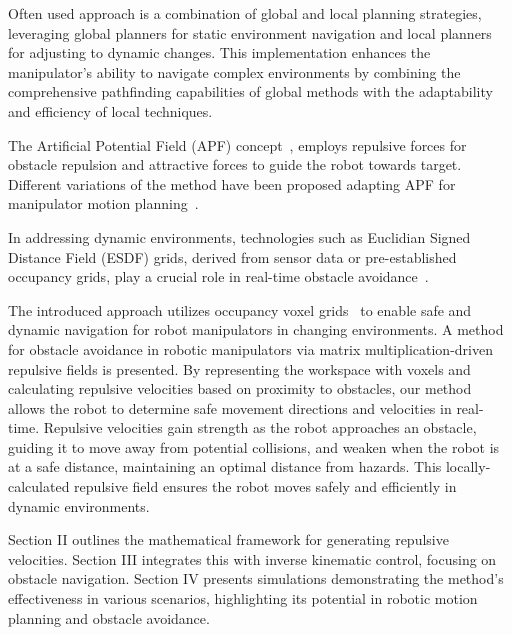 \documentclass[letterpaper, 10 pt, conference]{ieeeconf}  %
\begin{document}
Often used approach is a combination of global and local planning strategies, leveraging global planners for static environment navigation and local planners for adjusting to dynamic changes. This implementation enhances the manipulator's ability to navigate complex environments by combining the comprehensive pathfinding capabilities of global methods with the adaptability and efficiency of local techniques.

The Artificial Potential Field (APF) concept~\cite{c33}, employs repulsive forces for obstacle repulsion and attractive forces to guide the robot towards target. Different variations of the method have been proposed adapting APF for manipulator motion planning~\cite{klancar2022robot, c49,park2020trajectory,baumgartner2023potential, c30}.

In addressing dynamic environments, technologies such as Euclidian Signed Distance Field (ESDF) grids, derived from sensor data or pre-established occupancy grids, play a crucial role in real-time obstacle avoidance~\cite{oleynikova2017voxblox,han2019fiesta,zhou2021egoplanner}. 


The introduced approach utilizes occupancy voxel grids~\cite{han2018dynamic} to enable safe and dynamic navigation for robot manipulators in changing environments. A method for obstacle avoidance in robotic manipulators via matrix multiplication-driven repulsive fields is presented. By representing the workspace with voxels and calculating repulsive velocities based on proximity to obstacles, our method allows the robot to determine safe movement directions and velocities in real-time. Repulsive velocities gain strength as the robot approaches an obstacle, guiding it to move away from potential collisions, and weaken when the robot is at a safe distance, maintaining an optimal distance from hazards. This locally-calculated repulsive field ensures the robot moves safely and efficiently in dynamic environments.

Section II outlines the mathematical framework for generating repulsive velocities. Section III integrates this with inverse kinematic control, focusing on obstacle navigation. Section IV presents simulations demonstrating the method's effectiveness in various scenarios, highlighting its potential in robotic motion planning and obstacle avoidance.
\end{document}
